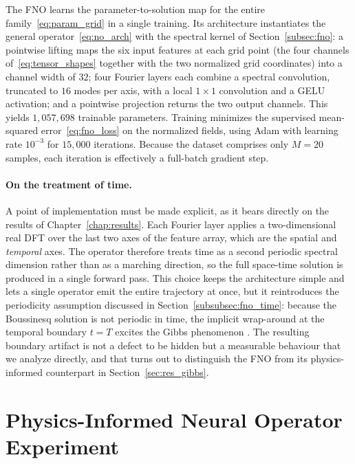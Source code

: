 The FNO learns the parameter-to-solution map for the entire family~\eqref{eq:param_grid} in a single training. Its architecture instantiates the general operator~\eqref{eq:no_arch} with the spectral kernel of Section~\ref{subsec:fno}: a pointwise lifting maps the six input features at each grid point (the four channels of~\eqref{eq:tensor_shapes} together with the two normalized grid coordinates) into a channel width of $32$; four Fourier layers each combine a spectral convolution, truncated to $16$ modes per axis, with a local $1\times 1$ convolution and a GELU activation; and a pointwise projection returns the two output channels. This yields $1{,}057{,}698$ trainable parameters. Training minimizes the supervised mean-squared error~\eqref{eq:fno_loss} on the normalized fields, using Adam with learning rate $10^{-3}$ for $15{,}000$ iterations. Because the dataset comprises only $M = 20$ samples, each iteration is effectively a full-batch gradient step.

\paragraph{On the treatment of time.} A point of implementation must be made explicit, as it bears directly on the results of Chapter~\ref{chap:results}. Each Fourier layer applies a two-dimensional real DFT over the last two axes of the feature array, which are the spatial and \emph{temporal} axes. The operator therefore treats time as a second periodic spectral dimension rather than as a marching direction, so the full space-time solution is produced in a single forward pass. This choice keeps the architecture simple and lets a single operator emit the entire trajectory at once, but it reintroduces the periodicity assumption discussed in Section~\ref{subsubsec:fno_time}: because the Boussinesq solution is not periodic in time, the implicit wrap-around at the temporal boundary $t = T$ excites the Gibbs phenomenon \parencite{gibbs1899}. The resulting boundary artifact is not a defect to be hidden but a measurable behaviour that we analyze directly, and that turns out to distinguish the FNO from its physics-informed counterpart in Section~\ref{sec:res_gibbs}.

\section{Physics-Informed Neural Operator Experiment}
\label{sec:met_pino}

